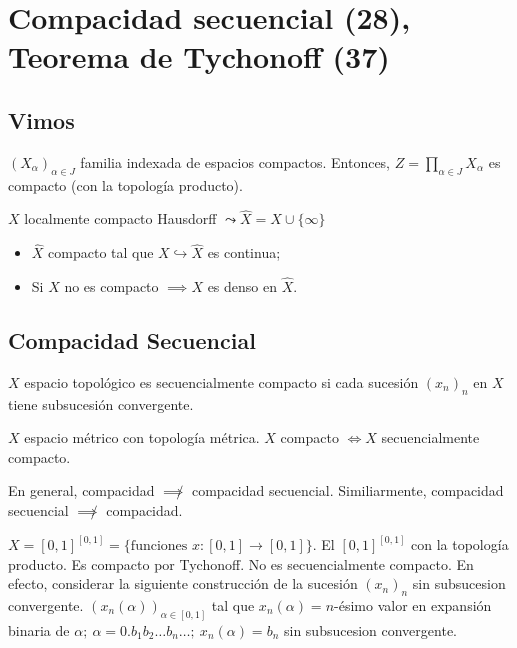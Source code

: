
\section{Compacidad secuencial (28), Teorema de Tychonoff (37)}

\subsection*{Vimos}

\begin{theorem}[Tychonoff]
	$(X_{\alpha})_{\alpha \in J}$ familia indexada de espacios compactos. Entonces, $Z = \prod_{\alpha \in J} X_{\alpha}$ es compacto (con la topología producto).
\end{theorem}

\begin{definition}
	$X$ localmente compacto Hausdorff $\leadsto \hat{X} = X \cup \{\infty\}$
	\begin{itemize}
		\item $\hat{X}$ compacto tal que $X \hookrightarrow \hat{X}$ es continua;

		\item Si $X$ no es compacto $\implies X$ es denso en $\hat{X}$.
	\end{itemize}
\end{definition}

\subsection{Compacidad Secuencial}

\begin{definition}
	$X$ espacio topológico es secuencialmente compacto si cada sucesión $(x_{n})_{n}$ en $X$ tiene subsucesión convergente.
\end{definition}

\begin{theorem}
	$X$ espacio métrico con topología métrica. $X$ compacto $\iff X$ secuencialmente compacto.
\end{theorem}

\begin{remark}
	En general, compacidad $\not\implies$ compacidad secuencial. Similiarmente, compacidad secuencial $\not\implies$ compacidad.
\end{remark}

\begin{eg}
	$X = [0,1]^{[0,1]} = \{\text{funciones } x : [0,1] \to [0,1]\}$. El $[0,1]^{[0,1]}$ con la topología producto. Es compacto por Tychonoff. No es secuencialmente compacto. En efecto, considerar la siguiente construcción de la sucesión $(x_{n})_{n}$ sin subsucesion convergente. $(x_{n}(\alpha))_{\alpha \in [0,1]}$ tal que $x_{n}(\alpha) = n$-ésimo valor en expansión binaria de $\alpha;\ \alpha = 0.b_{1}b_{2} \dots b_{n}\dots;\ x_{n}(\alpha) = b_{n}$ sin subsucesion convergente.
\end{eg}

